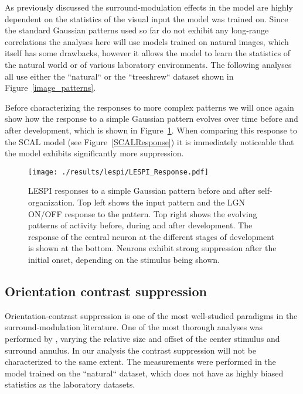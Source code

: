 As previously discussed the surround-modulation effects in the model
are highly dependent on the statistics of the visual input the model
was trained on. Since the standard Gaussian patterns used so far do
not exhibit any long-range correlations the analyses here will use
models trained on natural images, which itself has some drawbacks,
however it allows the model to learn the statistics of the natural
world or of various laboratory environments. The following analyses
all use either the ``natural`` or the ``treeshrew`` dataset shown in
Figure~\ref{image_patterns}.

Before characterizing the responses to more complex patterns we will
once again show how the response to a simple Gaussian pattern evolves
over time before and after development, which is shown in
Figure~\ref{LESPIResponse}. When comparing this response to the SCAL
model (see Figure~\ref{SCALResponse}) it is immediately noticeable
that the model exhibits significantly more suppression.

\begin{figure}
	\centering
    \texttt{[image: ./results/lespi/LESPI\_Response.pdf]}
	\caption[LESPI responses to a simple Gaussian pattern before and
      after self-organization.]{LESPI responses to a simple Gaussian
      pattern before and after self-organization. Top left shows the
      input pattern and the LGN ON/OFF response to the pattern. Top
      right shows the evolving patterns of activity before, during and
      after development. The response of the central neuron at the
      different stages of development is shown at the bottom. Neurons
      exhibit strong suppression after the initial onset, depending on
      the stimulus being shown.}
	\label{LESPIResponse}
\end{figure}

\subsection{Orientation contrast suppression}

Orientation-contrast suppression is one of the most well-studied
paradigms in the surround-modulation literature. One of the most
thorough analyses was performed by \cite{Jones2002}, varying the
relative size and offset of the center stimulus and surround
annulus. In our analysis the contrast suppression will not be
characterized to the same extent. The measurements were performed in
the model trained on the ``natural`` dataset, which does not have as
highly biased statistics as the laboratory datasets.

